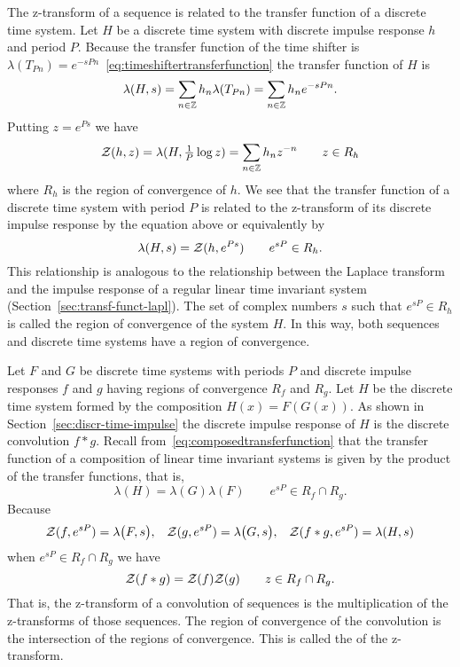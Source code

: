 The z-transform of a sequence is related to the transfer function of a discrete time system.  Let $H$ be a discrete time system with discrete impulse response $h$ and period $P$.  Because the transfer function of the time shifter is $\lambda(T_{Pn}) = e^{-sPn}$~\eqref{eq:timeshiftertransferfunction} the transfer function of $H$ is
\[
\lambda(H,s) = \sum_{n \in {\mathbb Z}} h_n \lambda( T_{Pn} ) = \sum_{n \in {\mathbb Z}} h_n e^{-sP n}.
\]
Putting $z = e^{Ps}$ we have
\[
{\mathcal Z}(h,z) = \lambda(H, \tfrac{1}{P} \log z) = \sum_{n \in {\mathbb Z}} h_n z^{-n} \qquad z \in R_h
\]
where $R_h$ is the region of convergence of $h$.  We see that the transfer function of a discrete time system with period $P$ is related to the z-transform of its discrete impulse response by the equation above or equivalently by
\begin{equation}\label{eq:reltransferfunztrans}
\lambda(H,s) = {\mathcal Z}(h,e^{Ps}) \qquad e^{sP} \in R_h.
\end{equation}
This relationship is analogous to the relationship between the Laplace transform and the impulse response of a regular linear time invariant system (Section~\ref{sec:transf-funct-lapl}).  The set of complex numbers $s$ such that $e^{sP} \in R_h$ is called the region of convergence of the system $H$.  In this way, both sequences and discrete time systems have a region of convergence. 

Let $F$ and $G$ be discrete time systems with periods $P$ and discrete impulse responses $f$ and $g$ having regions of convergence $R_f$ and $R_g$.  Let $H$ be the discrete time system formed by the composition $H(x)=F(G(x))$.  As shown in Section~\ref{sec:discr-time-impulse} the discrete impulse response of $H$ is the discrete convolution $f * g$.  Recall from~\eqref{eq:composedtransferfunction} that the transfer function of a composition of linear time invariant systems is given by the product of the transfer functions, that is,
\[
\lambda( H ) = \lambda(G)\lambda(F) \qquad e^{sP} \in R_f \cap R_g.
\]
Because
\[
{\mathcal Z}(f, e^{sP}) = \lambda\big( F ,s \big) , \;\;\; {\mathcal Z}(g, e^{sP}) = \lambda\big( G ,s \big), \;\;\; {\mathcal Z}(f * g, e^{sP}) = \lambda( H ,s )
\]
when $e^{sP} \in R_f \cap R_g$ we have
\[
{\mathcal Z}( f * g) = {\mathcal Z}(f) {\mathcal Z}(g) \qquad z \in R_f \cap R_g.
\]
That is, the z-transform of a convolution of sequences is the multiplication of the z-transforms of those sequences.  The region of convergence of the convolution is the intersection of the regions of convergence.  This is called the  of the z-transform.

